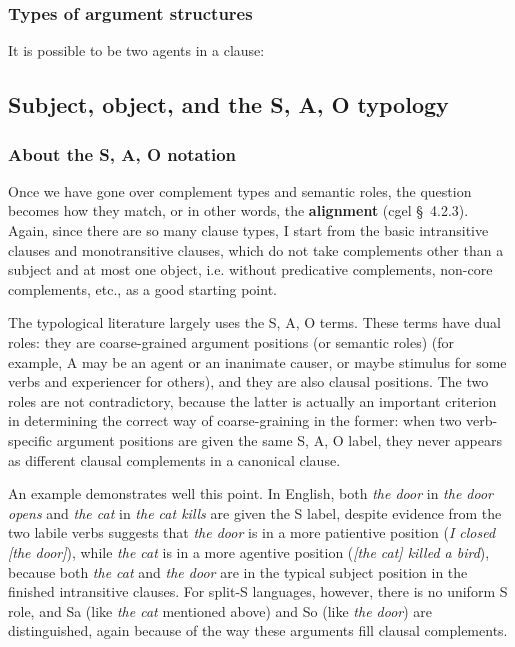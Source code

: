 \documentclass{article}
\newcommand*{\citesec}[1]{\S~{#1}}
\newcommand*{\concept}[1]{\textbf{#1}}
\newcommand*{\corpus}[1]{\emph{#1}}
\begin{document}

\subsubsection{Types of argument structures}

It is possible to be two agents in a clause: 

\subsection{Subject, object, and the S, A, O typology}

\subsubsection{About the S, A, O notation}

Once we have gone over complement types and semantic roles,
the question becomes how they match, or in other words, the \concept{alignment}
(\ac{cgel} \citesec{4.2.3}).
Again, since there are so many clause types, 
I start from the basic intransitive clauses and monotransitive clauses,
which do not take complements other than a subject and at most one object, 
i.e. without predicative complements, 
non-core complements, etc.,
as a good starting point.

The typological literature largely uses the S, A, O terms.
These terms have dual roles:
they are coarse-grained argument positions (or semantic roles)
(for example, A may be an agent or an inanimate causer, 
or maybe stimulus for some verbs and experiencer for others),
and they are also clausal positions.
The two roles are not contradictory, 
because the latter is actually an important criterion 
in determining the correct way of coarse-graining in the former:
when two verb-specific argument positions are given the same S, A, O label,
they never appears as different clausal complements in a canonical clause.

An example demonstrates well this point.
In English, both \corpus{the door} in \corpus{the door opens}
and \corpus{the cat} in \corpus{the cat kills} 
are given the S label,
despite evidence from the two labile verbs suggests that 
\corpus{the door} is in a more patientive position (\corpus{I closed [the door]}), 
while \corpus{the cat} is in a more agentive position (\corpus{[the cat] killed a bird}),
because both \corpus{the cat} and \corpus{the door} are in the typical subject position 
in the finished intransitive clauses.
For split-S languages, however, there is no uniform S role,
and Sa (like \corpus{the cat} mentioned above)
and So (like \corpus{the door})
are distinguished, 
again because of the way these arguments fill clausal complements.
\end{document}
